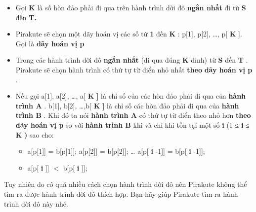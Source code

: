 \begin{itemize}
	\item Gọi \textbf{ K } là số hòn đảo phải đi qua trên hành trình dời đô \textbf{ ngắn nhất } đi từ \textbf{ S } đến \textbf{ T. }
	\item Pirakute sẽ chọn một dãy hoán vị các số từ \textbf{ 1 } đến \textbf{ K } : p[1], p[2], …, p[ \textbf{ K } ]. Gọi là \textbf{ dãy hoán vị p }
	\item Trong các hành trình dời đô \textbf{ ngắn nhất } (đi qua đúng \textbf{ K } đỉnh) từ \textbf{ S } đến \textbf{ T } . Pirakute sẽ chọn hành trình có thứ tự từ điển nhỏ nhất \textbf{ theo }\textbf{ dãy hoán vị p } .
	\item Nếu gọi a[1], a[2], …, a[ \textbf{ K }\textbf{ ] } là chỉ số của các hòn đảo phải đi qua của \textbf{ hành trình A } . b[1], b[2], …,b[ \textbf{ K }\textbf{ ] }\textbf{} là chỉ số các hòn đảo phải đi qua của \textbf{ hành trình B } . Khi đó ta nói \textbf{ hành trình A } có thứ tự từ điển theo nhỏ hơn \textbf{}\textbf{ theo }\textbf{ dãy hoán vị p } so với \textbf{ hành trình B } khi và chỉ khi tồn tại một số \textbf{ i } (1 ≤ \textbf{ i } ≤ \textbf{ K }\textbf{ ) }\textbf{} sao cho:
\begin{itemize}
	\item a[p[1]] = b[p[1]]; a[p[2]] = b[p[2]]; … a[p[ \textbf{ i } -1]] = b[p[ \textbf{ i } -1]];
\end{itemize}
\begin{itemize}
	\item a[p[ \textbf{ i } ]] $<$ b[p[ \textbf{ i } ]];
\end{itemize}
\end{itemize}
\begin{itemize}
\end{itemize}

Tuy nhiên do có quá nhiều cách chọn hành trình dời đô nên Pirakute không thể tìm ra được hành trình dời đô thích hợp. Bạn hãy giúp Pirakute tìm ra hành trình dời đô này nhé.